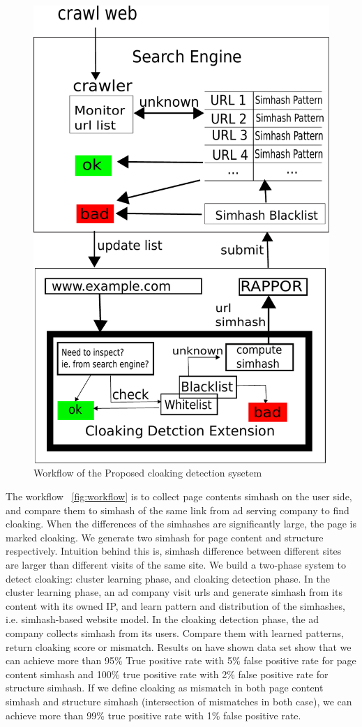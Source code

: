\begin{figure}[t]
  \centering
  \includegraphics[width=.5\textwidth]{fig/workflow}
  \caption{Workflow of the Proposed cloaking detection sysetem}
  \label{fig:workflow}
\end{figure}




The workflow ~\autoref{fig:workflow} is to collect page contents simhash on the user side, and compare
them to simhash of the same link from ad serving company to find cloaking. When
the differences of the simhashes are significantly large, the page is marked
cloaking. We generate two simhash for page content and structure respectively.
Intuition behind this is, simhash difference between different sites are larger
than different visits of the same site. We build a two-phase system to detect
cloaking: cluster learning phase, and cloaking detection phase. In the cluster
learning phase, an ad company visit urls and generate simhash from its content
with its owned IP, and learn pattern and distribution of the simhashes, i.e.
simhash-based website model. In the cloaking detection phase, the ad company
collects simhash from its users. Compare them with learned patterns, return
cloaking score or mismatch. Results on have shown data set show that we can
achieve more than 95\% True positive rate with 5\% false positive rate for page
content simhash and 100\% true positive rate with 2\% false positive rate for
structure simhash. If we define cloaking as mismatch in both page content
simhash and structure simhash (intersection of mismatches in both case), we can
achieve more than 99\% true positive rate with 1\% false positive rate.


